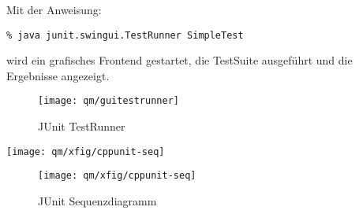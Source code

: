Mit der Anweisung:
\begin{verbatim}
% java junit.swingui.TestRunner SimpleTest
\end{verbatim}
wird ein grafisches Frontend gestartet,
die TestSuite ausgeführt und die Ergebnisse angezeigt.
\begin{figure}[H]
\begin{center}
\texttt{[image: qm/guitestrunner]}
\end{center}
\caption{JUnit TestRunner}
\end{figure}
\ifslides
\newpage
\texttt{[image: qm/xfig/cppunit-seq]}
\else
\begin{figure}[H]
\texttt{[image: qm/xfig/cppunit-seq]}
\caption{JUnit Sequenzdiagramm}
\end{figure}
\fi

